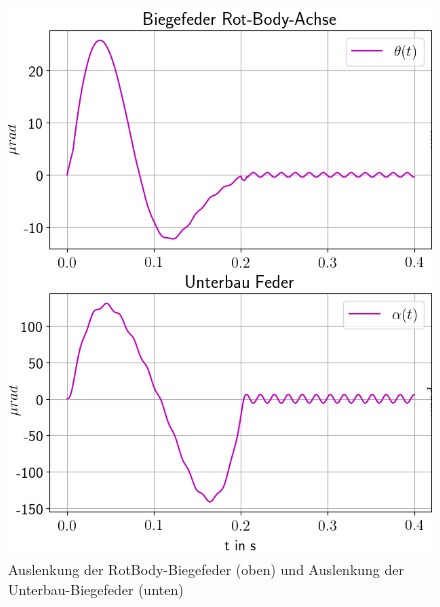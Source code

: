 \documentclass[10pt,a4paper]{iace.report}
\begin{document}
				\begin{figure}[!h]
					\centering
					\includegraphics[width=0.6\linewidth]{./pics/federn_shift.png}
					\caption{Auslenkung der RotBody-Biegefeder (oben) und Auslenkung der Unterbau-Biegefeder (unten)}
					\label{fig:sim3federn}
				\end{figure}
\end{document}
